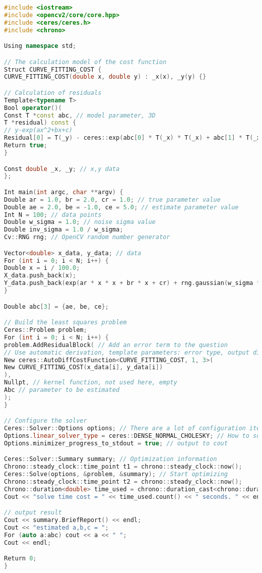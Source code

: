 \begin{lstlisting}[language=c++,caption=slambook/ch6/ceresCurveFitting.cpp]
#include <iostream>
#include <opencv2/core/core.hpp>
#include <ceres/ceres.h>
#include <chrono>

Using namespace std;

// The calculation model of the cost function
Struct CURVE_FITTING_COST {
CURVE_FITTING_COST(double x, double y) : _x(x), _y(y) {}

// Calculation of residuals
Template<typename T>
Bool operator()(
Const T *const abc, // model parameter, 3D
T *residual) const {
// y-exp(ax^2+bx+c)
Residual[0] = T(_y) - ceres::exp(abc[0] * T(_x) * T(_x) + abc[1] * T(_x) + abc[2]);
Return true;
}

Const double _x, _y; // x,y data
};

Int main(int argc, char **argv) {
Double ar = 1.0, br = 2.0, cr = 1.0; // true parameter value
Double ae = 2.0, be = -1.0, ce = 5.0; // estimate parameter value
Int N = 100; // data points
Double w_sigma = 1.0; // noise sigma value
Double inv_sigma = 1.0 / w_sigma;
Cv::RNG rng; // OpenCV random number generator

Vector<double> x_data, y_data; // data
For (int i = 0; i < N; i++) {
Double x = i / 100.0;
X_data.push_back(x);
Y_data.push_back(exp(ar * x * x + br * x + cr) + rng.gaussian(w_sigma * w_sigma));
}

Double abc[3] = {ae, be, ce};

// Build the least squares problem
Ceres::Problem problem;
For (int i = 0; i < N; i++) {
problem.AddResidualBlock( // Add an error term to the question
// Use automatic derivation, template parameters: error type, output dimension, input dimension, dimension must be consistent with the previous struct
New ceres::AutoDiffCostFunction<CURVE_FITTING_COST, 1, 3>(
New CURVE_FITTING_COST(x_data[i], y_data[i])
),
Nullpt, // kernel function, not used here, empty
Abc // parameter to be estimated
);
}

// Configure the solver
Ceres::Solver::Options options; // There are a lot of configuration items to fill in
Options.linear_solver_type = ceres::DENSE_NORMAL_CHOLESKY; // How to solve the incremental equation
Options.minimizer_progress_to_stdout = true; // output to cout

Ceres::Solver::Summary summary; // Optimization information
Chrono::steady_clock::time_point t1 = chrono::steady_clock::now();
Ceres::Solve(options, &problem, &summary); // Start optimizing
Chrono::steady_clock::time_point t2 = chrono::steady_clock::now();
Chrono::duration<double> time_used = chrono::duration_cast<chrono::duration<double>>(t2 - t1);
Cout << "solve time cost = " << time_used.count() << " seconds. " << endl;

// output result
Cout << summary.BriefReport() << endl;
Cout << "estimated a,b,c = ";
For (auto a:abc) cout << a << " ";
Cout << endl;

Return 0;
}
\end{lstlisting}

